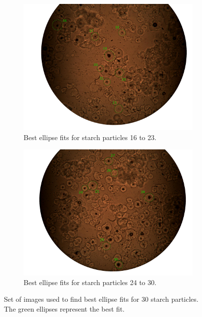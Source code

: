 \begin{figure}[h!]
    \medskip
    \begin{subfigure}[b]{0.475\textwidth}
        \centering
        \includegraphics[width=\textwidth, frame]{afbeeldingen/size/zetmeel/zetmeel_5.png}
        \caption{Best ellipse fits for starch particles 16 to 23.}   
        \label{fig_zetmeel_5}
    \end{subfigure}
    \hspace*{\fill}
    \begin{subfigure}[b]{0.475\textwidth}
        \centering
        \includegraphics[width=\textwidth, frame]{afbeeldingen/size/zetmeel/zetmeel_6.png}
        \caption{Best ellipse fits for starch particles 24 to 30.}   
        \label{fig_zetmeel_6}
    \end{subfigure}
    
    \caption{Set of images used to find best ellipse fits for 30 starch particles. The green ellipses represent the best fit.} 
	\label{fig_zetmeel}
\end{figure}
